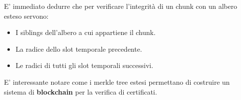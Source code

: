 E' immediato dedurre che per verificare l'integrità di un chunk con un albero esteso servono:
\begin{proposition}
\begin{itemize}
    \item I siblings dell'albero a cui appartiene il chunk.
    \item La radice dello slot temporale precedente.
    \item Le radici di tutti gli slot temporali successivi.
\end{itemize}
\end{proposition}
\begin{remark}
E' interessante notare come i merkle tree estesi permettano di costruire un sistema di \textbf{blockchain} per la verifica di certificati.
\end{remark}
